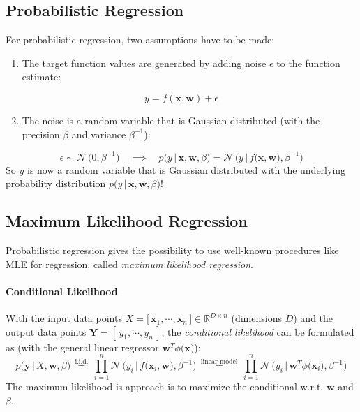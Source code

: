 \documentclass[a4paper, 11pt, accentcolor = tud3b]{tudreport}
\newcommand{\given}{\ensuremath{\,\vert\,}}
\newcommand{\R}{\ensuremath{\mathbb{R}}}
\renewcommand{\vec}[1]{\mathbf{#1}}
\begin{document}
			\subsection{Probabilistic Regression}
				For probabilistic regression, two assumptions have to be made:
				\begin{enumerate}
					\item The target function values are generated by adding noise \(\epsilon\) to the function estimate:
				\end{enumerate}
				\begin{equation}
					y = f(\vec{x}, \vec{w}) + \epsilon
				\end{equation}
				\begin{enumerate} \setcounter{enumi}{1}
					\item The noise is a random variable that is Gaussian distributed (with the precision \( \beta \) and variance \( \beta^{-1} \)):
				\end{enumerate}
				\begin{equation}
					\epsilon \sim \mathcal{N}\,\big(0, \beta^{-1}\big) \quad\implies\quad p\big(y \given \vec{x}, \vec{w}, \beta\big) = \mathcal{N}\,\Big(y \given f\big(\vec{x}, \vec{w}\big), \beta^{-1}\Big)
				\end{equation}
				So \(y\) is now a random variable that is Gaussian distributed with the underlying probability distribution \( p\big(y \given \vec{x}, \vec{w}, \beta\big) \)!

			\subsection{Maximum Likelihood Regression}
				Probabilistic regression gives the possibility to use well-known procedures like MLE for regression, called \emph{maximum likelihood regression}.

				\paragraph{Conditional Likelihood}
					With the input data points \( X = \big[\, \vec{x}_1, \cdots, \vec{x}_n \,\big] \in \R^{D \times n} \) (dimensions \(D\)) and the output data points \( \vec{Y} = [\, y_1, \cdots, y_n \,] \), the \emph{conditional likelihood} can be formulated as (with the general linear regressor \( \vec{w}^T \phi\big(\vec{x}\big) \)):
					\begin{equation}
						p\big(\vec{y} \given X, \vec{w}, \beta\big) \,\overset{\textrm{i.i.d.}}{=}\, \prod_{i = 1}^{n} \mathcal{N}\,\Big(y_i \given f\big(\vec{x}_i, \vec{w}\big), \beta^{-1}\Big) \,\overset{\textrm{linear model}}{=}\, \prod_{i = 1}^{n} \mathcal{N}\,\Big(y_i \given \vec{w}^T \phi\big(\vec{x}_i\big), \beta^{-1}\Big)
					\end{equation}
					The maximum likelihood is approach is to maximize the conditional w.r.t. \(\vec{w}\) and \(\beta\).
\end{document}
